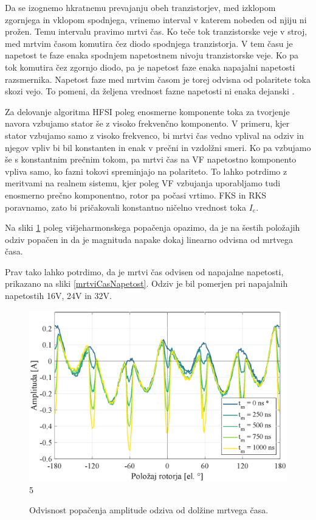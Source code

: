 \documentclass[a4paper,twoside,openright,12pt,slovene]{book}
\begin{document}
Da se izognemo hkratnemu prevajanju obeh tranzistorjev, med izklopom zgornjega in vklopom spodnjega, vrinemo interval v katerem nobeden od njiju ni prožen. Temu intervalu pravimo mrtvi čas. Ko teče tok
tranzistorske veje v stroj, med mrtvim časom komutira čez diodo spodnjega tranzistorja. V tem času je napetost te faze enaka spodnjem napetostnem nivoju tranzistorske veje. Ko pa tok komutira čez
zgornjo diodo, pa je napetost faze enaka napajalni napetosti razsmernika. Napetost faze med mrtvim časom je torej odvisna od polaritete toka skozi vejo. To pomeni, da željena vrednost fazne napetosti
ni enaka dejanski \cite{ambrovzivc2016elektrivcni}. 

Za delovanje algoritma HFSI poleg enosmerne komponente toka za tvorjenje navora vzbujamo stator še z visoko frekvenčno komponento. V primeru, kjer stator vzbujamo samo z visoko frekvenco, bi mrtvi čas
vedno vplival na odziv in njegov vpliv bi bil konstanten in enak v prečni in vzdolžni smeri. Ko pa vzbujamo še s konstantnim prečnim tokom, pa mrtvi čas na VF napetostno komponento vpliva samo, ko
fazni tokovi spreminjajo na polariteto. To lahko potrdimo z meritvami na realnem sistemu, kjer poleg VF vzbujanja uporabljamo tudi enosmerno prečno komponentno, rotor pa počasi vrtimo. FKS in RKS
poravnamo, zato bi pričakovali konstantno ničelno vrednost toka $I_e$.

Na sliki \ref{mrtviCas} poleg višjeharmonskega popačenja opazimo, da je na šestih položajih odziv popačen in da je magnituda napake dokaj linearno odvisna od mrtvega časa.

Prav tako lahko potrdimo, da je mrtvi čas odvisen od napajalne napetosti, prikazano na sliki \ref{mrtviCasNapetost}. Odziv je bil pomerjen pri napajalnih napetostih 16V, 24V in 32V.
\newpage
\begin{figure}[!htbp]
    \centering
    \includegraphics[width=0.95\columnwidth]{Slike/mrtviCas.eps}5
    \caption{\label{mrtviCas} Odvisnost popačenja amplitude odziva od dolžine mrtvega časa. }
\end{figure}
\end{document}
